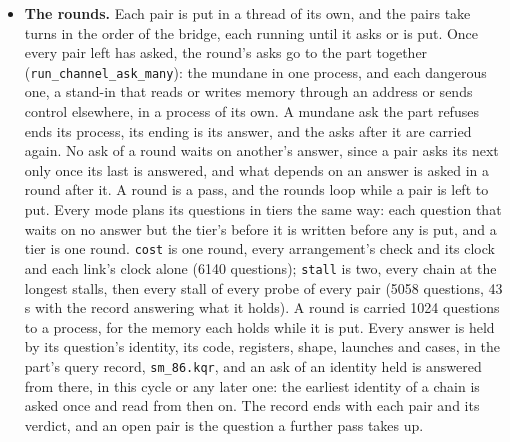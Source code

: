\begin{itemize}
\item \textbf{The rounds.} Each pair is put in a thread of its own, and the pairs take turns in the order of the bridge, each running until it asks or is put. Once every pair left has asked, the round's asks go to the part together (\texttt{run\_\allowbreak{}channel\_\allowbreak{}ask\_\allowbreak{}many}): the mundane in one process, and each dangerous one, a stand-in that reads or writes memory through an address or sends control elsewhere, in a process of its own. A mundane ask the part refuses ends its process, its ending is its answer, and the asks after it are carried again. No ask of a round waits on another's answer, since a pair asks its next only once its last is answered, and what depends on an answer is asked in a round after it. A round is a pass, and the rounds loop while a pair is left to put. Every mode plans its questions in tiers the same way: each question that waits on no answer but the tier's before it is written before any is put, and a tier is one round. \texttt{cost} is one round, every arrangement's check and its clock and each link's clock alone (6140 questions); \texttt{stall} is two, every chain at the longest stalls, then every stall of every probe of every pair (5058 questions, 43 s with the record answering what it holds). A round is carried 1024 questions to a process, for the memory each holds while it is put. Every answer is held by its question's identity, its code, registers, shape, launches and cases, in the part's query record, \texttt{sm\_\allowbreak{}86.\allowbreak{}kqr}, and an ask of an identity held is answered from there, in this cycle or any later one: the earliest identity of a chain is asked once and read from then on. The record ends with each pair and its verdict, and an open pair is the question a further pass takes up.

\end{itemize}
